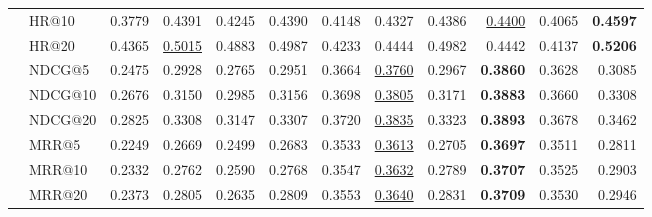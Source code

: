 \begin{tabular}{llrrrrrrrrrr}
 & HR@10 & 0.3779 & 0.4391 & 0.4245 & 0.4390 & 0.4148 & 0.4327 & 0.4386 & \underline{0.4400} & 0.4065 & \textbf{0.4597} \\
 & HR@20 & 0.4365 & \underline{0.5015} & 0.4883 & 0.4987 & 0.4233 & 0.4444 & 0.4982 & 0.4442 & 0.4137 & \textbf{0.5206} \\
 & NDCG@5 & 0.2475 & 0.2928 & 0.2765 & 0.2951 & 0.3664 & \underline{0.3760} & 0.2967 & \textbf{0.3860} & 0.3628 & 0.3085 \\
 & NDCG@10 & 0.2676 & 0.3150 & 0.2985 & 0.3156 & 0.3698 & \underline{0.3805} & 0.3171 & \textbf{0.3883} & 0.3660 & 0.3308 \\
 & NDCG@20 & 0.2825 & 0.3308 & 0.3147 & 0.3307 & 0.3720 & \underline{0.3835} & 0.3323 & \textbf{0.3893} & 0.3678 & 0.3462 \\
 & MRR@5 & 0.2249 & 0.2669 & 0.2499 & 0.2683 & 0.3533 & \underline{0.3613} & 0.2705 & \textbf{0.3697} & 0.3511 & 0.2811 \\
 & MRR@10 & 0.2332 & 0.2762 & 0.2590 & 0.2768 & 0.3547 & \underline{0.3632} & 0.2789 & \textbf{0.3707} & 0.3525 & 0.2903 \\
 & MRR@20 & 0.2373 & 0.2805 & 0.2635 & 0.2809 & 0.3553 & \underline{0.3640} & 0.2831 & \textbf{0.3709} & 0.3530 & 0.2946 \\
\hline
\end{tabular}
